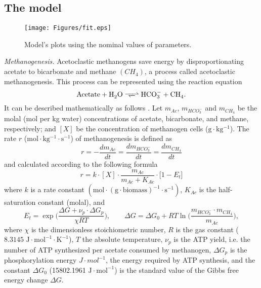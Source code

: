 \documentclass[a4paper, 12pt]{article}
\begin{document}
\subsection{The model}

\begin{figure}[]
\begin{center}
\texttt{[image: Figures/fit.eps]}
\caption{Model's plots using the nominal values of parameters.}\label{Fig:fit}
\end{center}
\end{figure}


{\it Methanogenesis.} Acetoclastic methanogens save energy by disproportionating acetate to bicarbonate and methane $(CH_4)$, a process called acetoclastic methanogenesis. This process can be represented using the reaction equation
\[
\ce{Acetate +H2O <=>>  HCO^{-}_3 + CH4}.
\]
It can be described mathematically as follows \cite{Jin2011}. Let  $m_{Ac}$, $m_{HCO_3^-}$ and $m_{CH_4}$ be the molal (mol per kg water) concentrations of acetate, bicarbonate, and methane, respectively; and  $[X]$ be the concentration of methanogen cells  ($\mathrm{g\cdot kg^{-1}}$). The rate $r$ ($\mathrm{mol\cdot kg^{-1}\cdot s^{-1}}$) of methanogenesis is defined as 
\[
r=-\frac{dm_{Ac}}{dt}=\frac{dm_{HCO_3^-}}{dt}=\frac{dm_{CH_4}}{dt}
\]
and calculated according to the following formula
\begin{equation}\label{Model:r}
r=k\cdot [X]\cdot \frac{m_{Ac}}{m_{Ac}+K_{Ac}}\cdot \big[1-E_t\big]
\end{equation}
where $k$ is a rate constant $(\mathrm{mol\cdot (g\cdot biomass)^{-1}\cdot s^{-1}})$, $K_{Ac}$ is the half-saturation constant (molal), and 
\begin{equation}\label{Model_Et}
E_t=\exp\Big(\frac{\Delta G+\nu_p\cdot\Delta G_p}{\chi R T}\Big),\qquad \Delta G= \Delta G_0+RT \ln\Big(\frac{m_{HCO_3^-}\cdot m_{CH_4}}{m_{Ac}}\Big),
\end{equation}
where $\chi$ is the dimensionless stoichiometric number, $R$ is the gas constant ($8.3145\,\,\mathrm{J}\cdot \mathrm{mol}^{-1}\cdot \mathrm{K}^{-1}$), $T$ the absolute temperature, $\nu_p$ is the ATP yield, i.e. the  number of ATP synthesized per acetate consumed by methanogen, $\Delta G_p$ is the phosphorylation energy  $J\cdot mol^{-1}$, the energy required by ATP synthesis, and the constant $\Delta G_0$ (15802.1961 $\mathrm{J\cdot mol^{-1}}$) is the standard value of the Gibbs free energy change $\Delta G$. 
\end{document}
